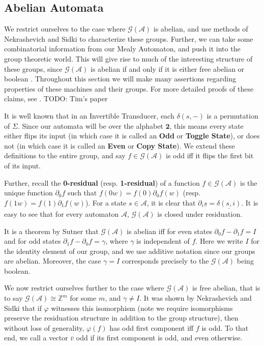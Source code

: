 \documentclass[12pt]{article}
\newcommand{\A}{\mathcal{A}}
\newcommand{\G}{\mathcal{G}}
\newcommand{\Z}{\mathbb{Z}}
\newcommand{\2}{\textbf{2}}
\newcommand{\del}{\partial}
\renewcommand{\v}{\bar{v}}
\begin{document}
\subsection{Abelian Automata}
We restrict ourselves to the case where $\G(\A)$ is abelian, 
and use methods of Nekrashevich and Sidki to characterize these groups.
Further, we can take some combinatorial information from our Mealy 
Automaton, and push it into the group theoretic world. This will give
rise to much of the interesting structure of these groups, since
$\G(\A)$ is abelian if and only if it is either free abelian or 
boolean \cite{NekrashevychSidki04:automorphisms}.
Throughout this section we will make many assertions regarding properties
of these machines and their groups. For more detailed proofs of these 
claims, see 
\cite{Nekrashevych05:self_similar_groups
     ,GrigorchukNS00:automata_groups
     ,Sidki00:one_rooted_trees
     ,SutnerLewi12:iter_inver_bin_trans
     ,Okano15:thesis
     ,Sutner18:abelian_automata
     }.
     TODO: Tim's paper

It is well known that in an Invertible Transducer, each $\delta(s,-)$
is a permutation of $\Sigma$. Since our automata will be over the alphabet
$\2$, this means every state either flips its input 
(in which case it is called an \textbf{Odd} or \textbf{Toggle State}), 
or does not
(in which case it is called an \textbf{Even} or \textbf{Copy State}).
We extend these definitions to the entire group, and say $f \in \G(\A)$ 
is odd iff it flips the first bit of its input.

Further, recall the \textbf{0-residual} (resp. \textbf{1-residual}) of a 
function $f \in \G(\A)$ is the unique function 
$\del_0 f$ such that $f(0w) = f(0) \del_0 f(w)$ 
(resp. $f(1w) = f(1) \del_1 f(w)$). 
For a state $s \in \A$, it is clear that 
$\del_i \underline{s} = \underline{\delta(s,i)}$.
It is easy to see that for every automaton $\A$, $\G(\A)$ is closed
under residuation.

It is a theorem by Sutner \cite{Sutner18:abelian_automata} 
that $\G(\A)$ is abelian iff for even states $\del_0 f - \del_1 f = I$ 
and for odd states $\del_1 f - \del_0 f = \gamma$, where $\gamma$ is 
independent of $f$. Here we write $I$ for the identity element of our group,
and we use additive notation since our groups are abelian.
Moreover, the case $\gamma = I$ corresponds precisely to the $\G(\A)$
being boolean.

We now restrict ourselves further to the case where $\G(\A)$ is 
free abelian, that is to say $\G(\A) \cong \Z^m$ for some $m$,
and $\gamma \not = I$.
It was shown by Nekrashevich and Sidki 
\cite{NekrashevychSidki04:automorphisms} that if $\varphi$ witnesses this 
isomorphism (note we require isomorphisms preserve the residuation structure
in addition to the group structure), then without loss of generality, 
$\varphi(f)$ has odd first component iff $f$ is odd. 
To that end, we call a vector $\v$ odd if its first component is odd, 
and even otherwise.
\end{document}
